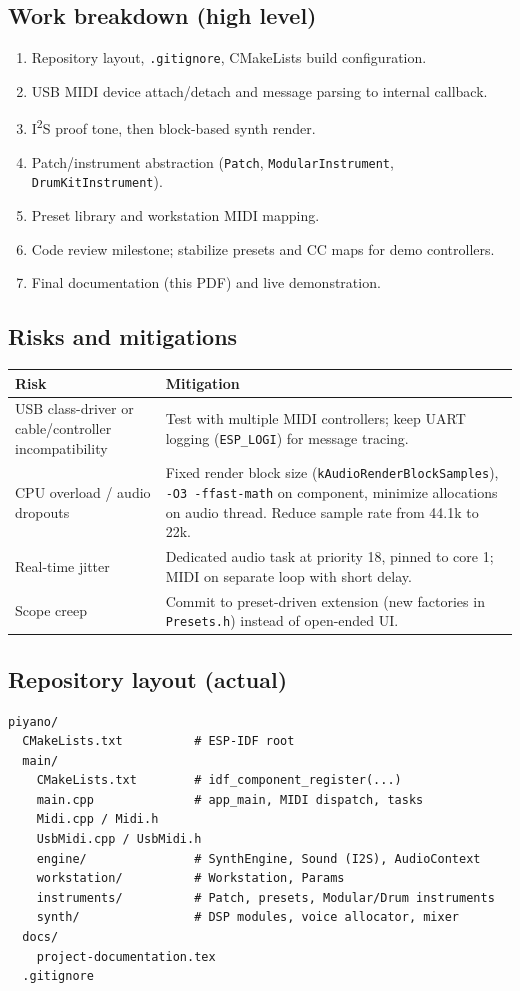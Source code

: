 \documentclass[11pt,a4paper]{article}
\begin{document}
\subsection{Work breakdown (high level)}
\begin{enumerate}[noitemsep]
  \item Repository layout, \texttt{.gitignore}, CMakeLists build configuration.
  \item USB MIDI device attach/detach and message parsing to internal callback.
  \item I\textsuperscript{2}S proof tone, then block-based synth render.
  \item Patch/instrument abstraction (\texttt{Patch}, \texttt{ModularInstrument}, \texttt{DrumKitInstrument}).
  \item Preset library and workstation MIDI mapping.
  \item Code review milestone; stabilize presets and CC maps for demo controllers.
  \item Final documentation (this PDF) and live demonstration.
\end{enumerate}

\subsection{Risks and mitigations}
\begin{longtable}{p{}p{}}
\toprule
\textbf{Risk} & \textbf{Mitigation} \\
\midrule
\endhead
USB class-driver or cable/controller incompatibility &
Test with multiple MIDI controllers; keep UART logging (\texttt{ESP\_LOGI}) for message tracing. \\
CPU overload / audio dropouts &
Fixed render block size (\texttt{kAudioRenderBlockSamples}), \texttt{-O3 -ffast-math} on component, minimize allocations on audio thread. Reduce sample rate from 44.1k to 22k.\\
Real-time jitter &
Dedicated audio task at priority 18, pinned to core 1; MIDI on separate loop with short delay. \\
Scope creep &
Commit to preset-driven extension (new factories in \texttt{Presets.h}) instead of open-ended UI. \\
\bottomrule
\end{longtable}
\pagebreak
\subsection{Repository layout (actual)}
\begin{lstlisting}
piyano/
  CMakeLists.txt          # ESP-IDF root
  main/
    CMakeLists.txt        # idf_component_register(...)
    main.cpp              # app_main, MIDI dispatch, tasks
    Midi.cpp / Midi.h
    UsbMidi.cpp / UsbMidi.h
    engine/               # SynthEngine, Sound (I2S), AudioContext
    workstation/          # Workstation, Params
    instruments/          # Patch, presets, Modular/Drum instruments
    synth/                # DSP modules, voice allocator, mixer
  docs/
    project-documentation.tex
  .gitignore
\end{lstlisting}
\end{document}
